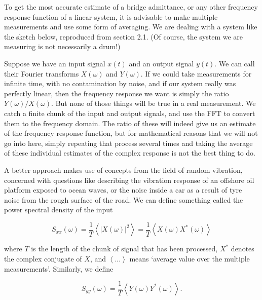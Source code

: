   To get the most accurate estimate of a bridge admittance, or any other 
  frequency response function of a linear system, it is advisable to make 
  multiple measurements and use some form of averaging. We are dealing with a 
  system like the sketch below, reproduced from section 2.1. (Of course, the 
  system we are measuring is not necessarily a drum!) 


  Suppose we have an input signal $x(t)$ and an output signal $y(t)$. We can 
  call their Fourier transforms $X(\omega)$ and $Y(\omega)$. If we could take 
  measurements for infinite time, with no contamination by noise, and if our 
  system really was perfectly linear, then the frequency response we want is 
  simply the ratio $Y(\omega)/X(\omega)$. But none of those things will be true 
  in a real measurement. We catch a finite chunk of the input and output 
  signals, and use the FFT to convert them to the frequency domain. The ratio 
  of these will indeed give us an estimate of the frequency response function, 
  but for mathematical reasons that we will not go into here, simply repeating 
  that process several times and taking the average of these individual 
  estimates of the complex response is not the best thing to do. 

  A better approach makes use of concepts from the field of random vibration, 
  concerned with questions like describing the vibration response of an 
  offshore oil platform exposed to ocean waves, or the noise inside a car as a 
  result of tyre noise from the rough surface of the road. We can define 
  something called the power spectral density of the input 

  \begin{equation*}S_{xx}(\omega) = \frac{1}{T}\left<|X(\omega)|^2 \right> = 
  \frac{1}{T}\left<X(\omega) X^*(\omega)\right> \tag{1}\end{equation*} 

  \noindent{}where $T$ is the length of the chunk of signal that has been 
  processed, $X^*$ denotes the complex conjugate of $X$, and $\left< ... 
  \right>$ means `average value over the multiple measurements'. Similarly, we 
  define 

  \begin{equation*}S_{yy}(\omega) = \frac{1}{T}\left<Y(\omega) 
  Y^*(\omega)\right> .\tag{2}\end{equation*} 

